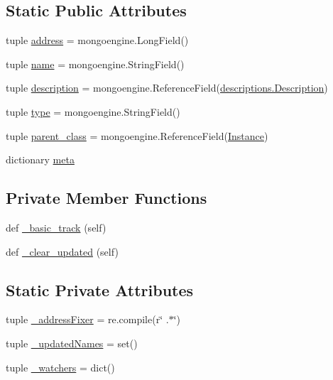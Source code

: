 \subsection*{Static Public Attributes}
\begin{DoxyCompactItemize}
\item 
tuple \hyperlink{classmemoryoracle_1_1instance_1_1Instance_a5fedf12b86436e597740001805187265}{address} = mongoengine.\+Long\+Field()
\item 
tuple \hyperlink{classmemoryoracle_1_1instance_1_1Instance_a2534bb2f3733b10de23efa5e81c36c94}{name} = mongoengine.\+String\+Field()
\item 
tuple \hyperlink{classmemoryoracle_1_1instance_1_1Instance_a3aa42ba898da1ab4e26f2b345cb22344}{description} = mongoengine.\+Reference\+Field(\hyperlink{classmemoryoracle_1_1descriptions_1_1Description}{descriptions.\+Description})
\item 
tuple \hyperlink{classmemoryoracle_1_1instance_1_1Instance_a91ca94e82ac4391a0b034d31322caf73}{type} = mongoengine.\+String\+Field()
\item 
tuple \hyperlink{classmemoryoracle_1_1instance_1_1Instance_a0e0c0814b7ef0c14542c7ea9e21721eb}{parent\+\_\+class} = mongoengine.\+Reference\+Field(\textquotesingle{}\hyperlink{classmemoryoracle_1_1instance_1_1Instance}{Instance}\textquotesingle{})
\item 
dictionary \hyperlink{classmemoryoracle_1_1instance_1_1Instance_a31fd202a9f8416abcad47ab2902370f8}{meta}
\end{DoxyCompactItemize}
\subsection*{Private Member Functions}
\begin{DoxyCompactItemize}
\item 
def \hyperlink{classmemoryoracle_1_1instance_1_1Instance_a254a208a64e4c7f32c514e2fb64edbbe}{\+\_\+basic\+\_\+track} (self)
\item 
def \hyperlink{classmemoryoracle_1_1instance_1_1Instance_a8d6cede9602381d2f2163a0545dd9d8c}{\+\_\+clear\+\_\+updated} (self)
\end{DoxyCompactItemize}
\subsection*{Static Private Attributes}
\begin{DoxyCompactItemize}
\item 
tuple \hyperlink{classmemoryoracle_1_1instance_1_1Instance_af08a37f33aa6d568f7848f1bb0641a8f}{\+\_\+address\+Fixer} = re.\+compile(r\char`\"{} .$\ast$\char`\"{})
\item 
tuple \hyperlink{classmemoryoracle_1_1instance_1_1Instance_ab71e83d01ee573f7684058021dc10de3}{\+\_\+updated\+Names} = set()
\item 
tuple \hyperlink{classmemoryoracle_1_1instance_1_1Instance_a8a701dbed8c8c14d7e59e94d78a559c0}{\+\_\+watchers} = dict()
\end{DoxyCompactItemize}


